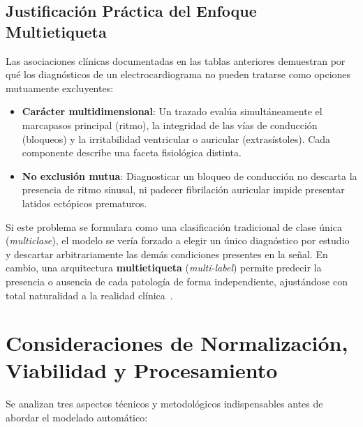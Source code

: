 \documentclass[11pt,a4paper]{article}
\begin{document}
\subsection{Justificación Práctica del Enfoque Multietiqueta}
Las asociaciones clínicas documentadas en las tablas anteriores demuestran por qué los diagnósticos de un electrocardiograma no pueden tratarse como opciones mutuamente excluyentes:
\begin{itemize}
    \item \textbf{Carácter multidimensional}: Un trazado evalúa simultáneamente el marcapasos principal (ritmo), la integridad de las vías de conducción (bloqueos) y la irritabilidad ventricular o auricular (extrasístoles). Cada componente describe una faceta fisiológica distinta.
    \item \textbf{No exclusión mutua}: Diagnosticar un bloqueo de conducción no descarta la presencia de ritmo sinusal, ni padecer fibrilación auricular impide presentar latidos ectópicos prematuros.
\end{itemize}

Si este problema se formulara como una clasificación tradicional de clase única (\textit{multiclase}), el modelo se vería forzado a elegir un único diagnóstico por estudio y descartar arbitrariamente las demás condiciones presentes en la señal. En cambio, una arquitectura \textbf{multietiqueta} (\textit{multi-label}) permite predecir la presencia o ausencia de cada patología de forma independiente, ajustándose con total naturalidad a la realidad clínica~\cite{alday2020cinc,koscova2024}.
\newpage

\section{Consideraciones de Normalización, Viabilidad y Procesamiento}

Se analizan tres aspectos técnicos y metodológicos indispensables antes de abordar el modelado automático:
\end{document}
